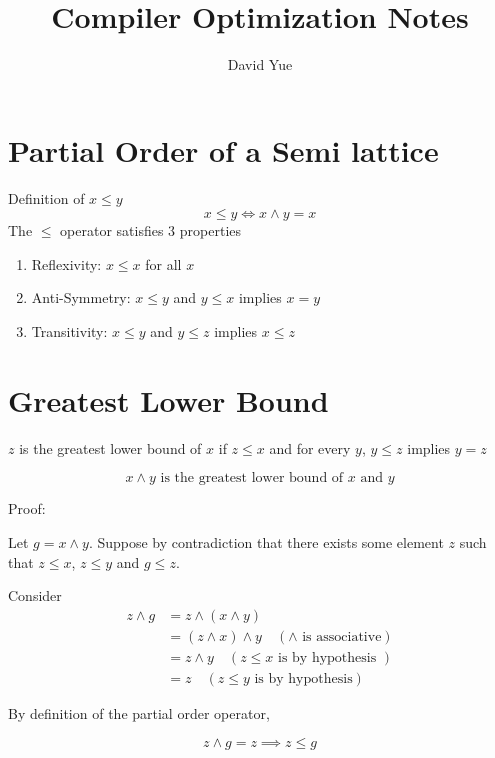 \documentclass{article}
\author{David Yue}
\title{Compiler Optimization Notes}
\date{}
\begin{document}
\maketitle
\section*{Partial Order of a Semi lattice}
Definition of \(x \leq y\)
\begin{equation*}
    x \leq y \iff x \wedge y = x
\end{equation*}
The \(\leq\) operator satisfies 3 properties
\begin{enumerate}
    \item Reflexivity: \(x \leq x \) for all \(x\)
    \item Anti-Symmetry: \(x \leq y\) and \(y \leq x\) implies \(x = y\)
    \item Transitivity: \(x \leq y\) and \(y \leq z\) implies \(x \leq z\)
\end{enumerate}

\section*{Greatest Lower Bound}

\(z\) is the greatest lower bound of \(x\) if \(z \leq x\) and for every \(y\),
\(y \leq z\) implies \(y = z\)

\begin{equation}
    x \wedge y \text{ is the greatest lower bound of } x \text{ and } y
\end{equation}

Proof:

Let \(g = x \wedge y\). Suppose by contradiction that there exists some
element \(z\) such that \(z \leq x\), \(z \leq y\) and \(g \leq z\).

Consider
\begin{align*}
    z \wedge g & = z \wedge (x \wedge y)                                       \\
               & = (z \wedge x) \wedge y \quad (\wedge \text{ is associative}) \\
               & = z \wedge y \quad (z \leq x \text{ is by hypothesis })       \\
               & = z  \quad (z \leq y \text{ is by hypothesis})
\end{align*}

By definition of the partial order operator,

\begin{equation}
    z \wedge g = z \implies z \leq g
\end{equation}
\end{document}
